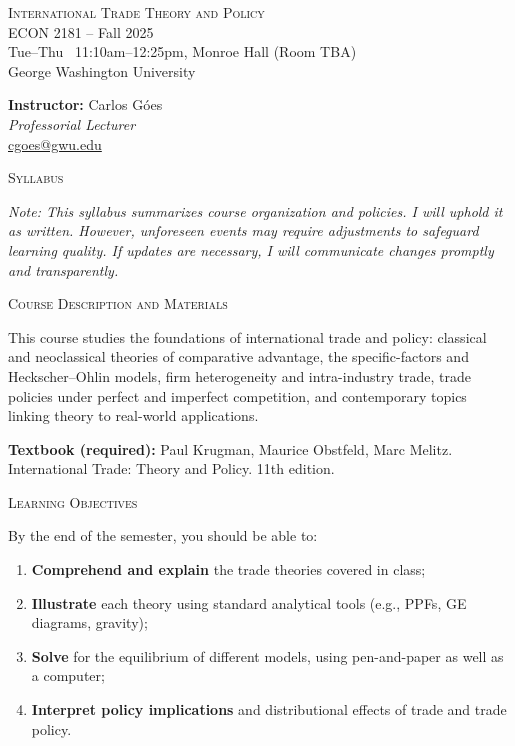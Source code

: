 \documentclass[11pt]{article}
\begin{document}
\begin{center}
\Large{\textsc{International Trade Theory and Policy}}\\[4pt]
\Large{ECON 2181 \;--\; Fall 2025}\\[6pt]
\LARGE{Tue--Thu \, 11:10am--12:25pm, Monroe Hall (Room TBA)}\\[4pt]
\Large{George Washington University}
\end{center}

\medskip

\begin{center}
\large \textbf{Instructor:} Carlos Góes \\
\textit{Professorial Lecturer}\\
\href{mailto:cgoes@gwu.edu}{cgoes@gwu.edu} \\
\end{center}

\bigskip

\begin{center}
\Large{\textsc{Syllabus}}
\end{center}

\bigskip

\noindent \textit{Note: This syllabus summarizes course organization and policies. I will uphold it as written. However, unforeseen events may require adjustments to safeguard learning quality. If updates are necessary, I will communicate changes promptly and transparently.}

\bigskip

\noindent\textsc{Course Description and Materials}

\smallskip
This course studies the foundations of international trade and policy: classical and neoclassical theories of comparative advantage, the specific-factors and Heckscher–Ohlin models, firm heterogeneity and intra-industry trade, trade policies under perfect and imperfect competition, and contemporary topics linking theory to real-world applications. 

\medskip
\textbf{Textbook (required):} Paul Krugman,  Maurice Obstfeld, Marc Melitz. International Trade: Theory and Policy. 11th edition.

\bigskip

\noindent\textsc{Learning Objectives}

\smallskip
By the end of the semester, you should be able to:
\begin{enumerate}
    \item \textbf{Comprehend and explain} the trade theories covered in class;
    \item \textbf{Illustrate} each theory using standard analytical tools (e.g., PPFs, GE diagrams, gravity);
    \item \textbf{Solve} for the equilibrium of different models, using pen-and-paper as well as a computer;
    \item \textbf{Interpret policy implications} and distributional effects of trade and trade policy.
\end{enumerate}
\end{document}
